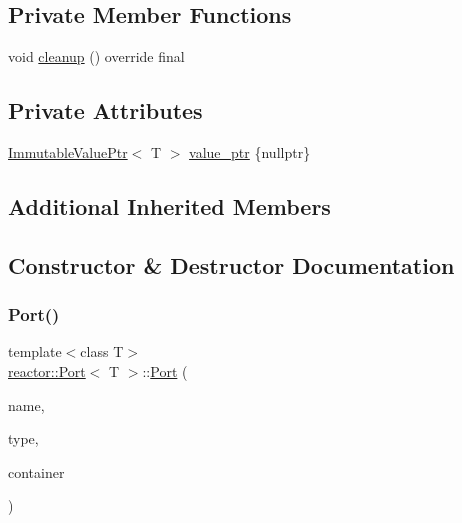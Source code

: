\subsection*{Private Member Functions}
\begin{DoxyCompactItemize}
\item 
void \hyperlink{classreactor_1_1Port_a05fdfca6fac003412700103e04ee66fd}{cleanup} () override final
\end{DoxyCompactItemize}
\subsection*{Private Attributes}
\begin{DoxyCompactItemize}
\item 
\hyperlink{classreactor_1_1ImmutableValuePtr}{Immutable\+Value\+Ptr}$<$ T $>$ \hyperlink{classreactor_1_1Port_adb40730eea54b529168a70cf8ed933c7}{value\+\_\+ptr} \{nullptr\}
\end{DoxyCompactItemize}
\subsection*{Additional Inherited Members}


\subsection{Constructor \& Destructor Documentation}
\mbox{\label{classreactor_1_1Port_a5cd32eff95f2606d94adc482bf6944af}} 
\subsubsection{\texorpdfstring{Port()}{Port()}}
{\footnotesize\ttfamily template$<$class T$>$ \\
\hyperlink{classreactor_1_1Port}{reactor\+::\+Port}$<$ T $>$\+::\hyperlink{classreactor_1_1Port}{Port} (\begin{DoxyParamCaption}\item[{const std\+::string \&}]{name,  }\item[{\hyperlink{namespacereactor_a08c8e2d85e5bc706b1af8a87e40eec6d}{Port\+Type}}]{type,  }\item[{\hyperlink{classreactor_1_1Reactor}{Reactor} $\ast$}]{container }\end{DoxyParamCaption})\hspace{0.3cm}{\ttfamily [inline]}}



